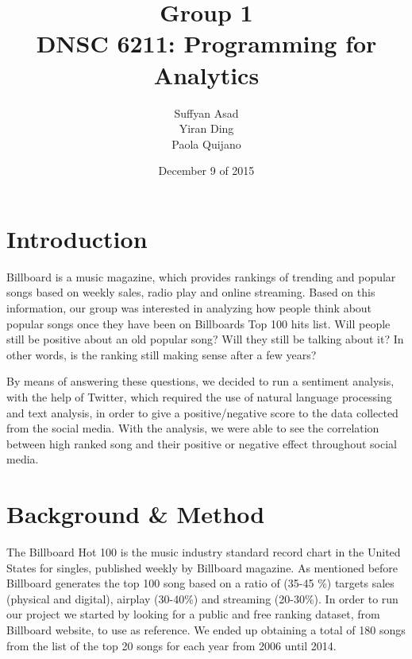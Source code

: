 \documentclass{article}
\title{Group 1  \\ \small{DNSC 6211: Programming for Analytics}}
\author{
	Suffyan Asad \\
	Yiran Ding \\
	Paola Quijano\\
}
\date{December 9 of 2015}
\begin{document}
\maketitle


\pagebreak
\tableofcontents


\pagebreak

%
%
\section{Introduction}
\label{introduction}

Billboard is a music magazine, which provides rankings of trending and popular songs based on weekly sales, radio play and online streaming.  Based on this information, our group was interested in analyzing how people think about popular songs once they have been on Billboard\textasciiacute s Top 100 hits list. Will people still be positive about an old popular song? Will they still be talking about it? In other words, is the ranking still making sense after a few years? 

By means of answering these questions, we decided to run a sentiment analysis, with the help of Twitter, which required the use of natural language processing and text analysis, in order to give a positive/negative score to the data collected from the social media. With the analysis, we were able to see the correlation between high ranked song and their positive or negative effect throughout social media. 

\section{Background \& Method}

The Billboard Hot 100 is the music industry standard record chart in the United States for singles, published weekly by Billboard magazine. As mentioned before Billboard generates the top 100 song based on a ratio of (35-45 \%) targets sales (physical and digital), airplay (30-40\%) and streaming (20-30\%)\cite{billboard}. In order to run our project we started by looking for a public and free ranking dataset, from Billboard website, to use as reference.  We ended up obtaining a total of 180 songs from the list of the top 20 songs for each year from 2006 until 2014.
\end{document}
